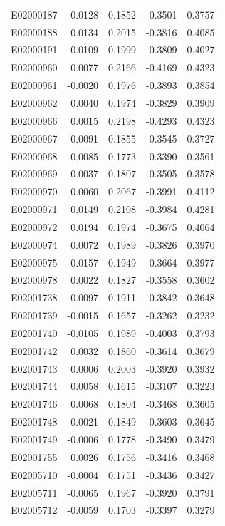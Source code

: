 \documentclass[11pt, a4paper]{article}
\begin{document}
\begin{longtable}{lrrrr}
E02000187 & 0.0128 & 0.1852 & -0.3501 & 0.3757 \\
E02000188 & 0.0134 & 0.2015 & -0.3816 & 0.4085 \\
E02000191 & 0.0109 & 0.1999 & -0.3809 & 0.4027 \\
E02000960 & 0.0077 & 0.2166 & -0.4169 & 0.4323 \\
E02000961 & -0.0020 & 0.1976 & -0.3893 & 0.3854 \\
E02000962 & 0.0040 & 0.1974 & -0.3829 & 0.3909 \\
E02000966 & 0.0015 & 0.2198 & -0.4293 & 0.4323 \\
E02000967 & 0.0091 & 0.1855 & -0.3545 & 0.3727 \\
E02000968 & 0.0085 & 0.1773 & -0.3390 & 0.3561 \\
E02000969 & 0.0037 & 0.1807 & -0.3505 & 0.3578 \\
E02000970 & 0.0060 & 0.2067 & -0.3991 & 0.4112 \\
E02000971 & 0.0149 & 0.2108 & -0.3984 & 0.4281 \\
E02000972 & 0.0194 & 0.1974 & -0.3675 & 0.4064 \\
E02000974 & 0.0072 & 0.1989 & -0.3826 & 0.3970 \\
E02000975 & 0.0157 & 0.1949 & -0.3664 & 0.3977 \\
E02000978 & 0.0022 & 0.1827 & -0.3558 & 0.3602 \\
E02001738 & -0.0097 & 0.1911 & -0.3842 & 0.3648 \\
E02001739 & -0.0015 & 0.1657 & -0.3262 & 0.3232 \\
E02001740 & -0.0105 & 0.1989 & -0.4003 & 0.3793 \\
E02001742 & 0.0032 & 0.1860 & -0.3614 & 0.3679 \\
E02001743 & 0.0006 & 0.2003 & -0.3920 & 0.3932 \\
E02001744 & 0.0058 & 0.1615 & -0.3107 & 0.3223 \\
E02001746 & 0.0068 & 0.1804 & -0.3468 & 0.3605 \\
E02001748 & 0.0021 & 0.1849 & -0.3603 & 0.3645 \\
E02001749 & -0.0006 & 0.1778 & -0.3490 & 0.3479 \\
E02001755 & 0.0026 & 0.1756 & -0.3416 & 0.3468 \\
E02005710 & -0.0004 & 0.1751 & -0.3436 & 0.3427 \\
E02005711 & -0.0065 & 0.1967 & -0.3920 & 0.3791 \\
E02005712 & -0.0059 & 0.1703 & -0.3397 & 0.3279 \\

\end{longtable}
\end{document}

